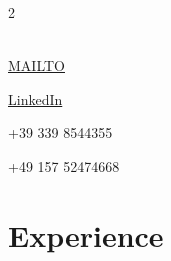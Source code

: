 \documentclass[lighthipster]{simplehipstercv}
\begin{document}
\begin{paracol}{2}
{\vfill

\\[0.5em]


 \href{mailto:daniele.ronchetti@outlook.it}{MAILTO}

 \href{https://www.linkedin.com/in/daniele-ronchetti/}{LinkedIn}

 +39 339 8544355

 +49 157 52474668

\phantom{turn the page}
\phantom{turn the page}
}
\switchcolumn

\small
\section*{Experience}


\end{paracol}
\end{document}
